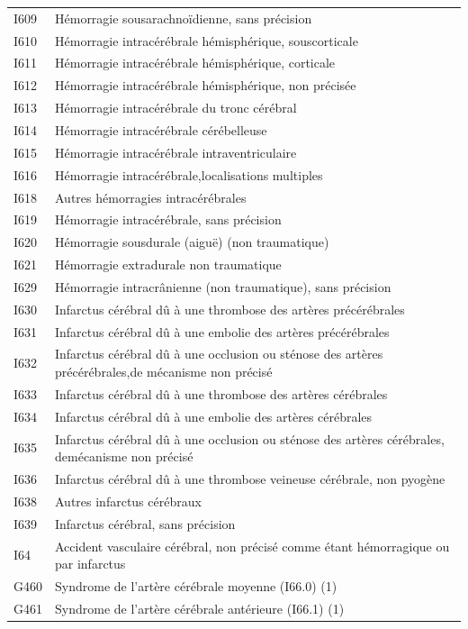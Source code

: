 \documentclass[12pt,english,french,twoside]{report}\usepackage[]{graphicx}\usepackage[]{color}
\begin{document}
\begin{longtable}{|l|l|}
 I609 & Hémorragie sousarachnoïdienne, sans précision \\
 I610 & Hémorragie intracérébrale hémisphérique, souscorticale \\
 I611 & Hémorragie intracérébrale hémisphérique, corticale \\
 I612 & Hémorragie intracérébrale hémisphérique, non précisée \\
 I613 & Hémorragie intracérébrale du tronc cérébral \\
 I614 & Hémorragie intracérébrale cérébelleuse \\
 I615 & Hémorragie intracérébrale intraventriculaire \\
 I616 & Hémorragie intracérébrale,localisations multiples \\
 I618 & Autres hémorragies intracérébrales \\
 I619 & Hémorragie intracérébrale, sans précision \\
 I620 & Hémorragie sousdurale (aiguë) (non traumatique) \\
 I621 & Hémorragie extradurale non traumatique \\
 I629 & Hémorragie intracrânienne (non traumatique), sans précision \\
 I630 & Infarctus cérébral dû à une thrombose des artères précérébrales \\
 I631 & Infarctus cérébral dû à une embolie des artères précérébrales \\
 I632 & Infarctus cérébral dû à une occlusion ou sténose des artères précérébrales,de mécanisme non précisé \\
 I633 & Infarctus cérébral dû à une thrombose des artères cérébrales \\
 I634 & Infarctus cérébral dû à une embolie des artères cérébrales \\
 I635 & Infarctus cérébral dû à une occlusion ou sténose des artères cérébrales, demécanisme non précisé \\
 I636 & Infarctus cérébral dû à une thrombose veineuse cérébrale, non pyogène \\
 I638 & Autres infarctus cérébraux \\
 I639 & Infarctus cérébral, sans précision \\
 I64 & Accident vasculaire cérébral, non précisé comme étant hémorragique ou par infarctus \\
 G460 & Syndrome de l'artère cérébrale moyenne (I66.0) (1) \\
 G461 & Syndrome de l'artère cérébrale antérieure (I66.1) (1) \\

\end{longtable}
\end{document}
